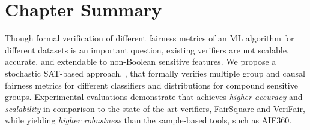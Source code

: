 \section{Chapter Summary}
Though formal verification of different fairness metrics of an ML algorithm for different datasets is an important question, existing verifiers are not scalable, accurate, and extendable to non-Boolean sensitive features. We propose a stochastic SAT-based approach, {\justicia}, that formally verifies multiple group and causal fairness metrics for different classifiers and distributions for compound sensitive groups.
Experimental evaluations demonstrate that {\justicia} achieves \textit{higher accuracy} and \textit{scalability} in comparison to the state-of-the-art verifiers, FairSquare and VeriFair, while yielding \textit{higher robustness} than the sample-based tools, such as AIF360.



